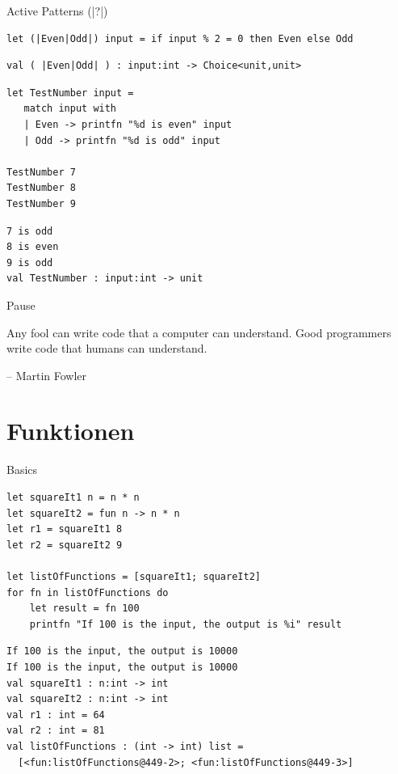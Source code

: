 \documentclass[t]{beamer}
\begin{document}
\begin{frame}[label={sec:org6b47015},fragile]{Active Patterns (|?|)}
 \scriptsize
\begin{verbatim}
let (|Even|Odd|) input = if input % 2 = 0 then Even else Odd
\end{verbatim}

\begin{verbatim}
val ( |Even|Odd| ) : input:int -> Choice<unit,unit>
\end{verbatim}


\begin{verbatim}
let TestNumber input =
   match input with
   | Even -> printfn "%d is even" input
   | Odd -> printfn "%d is odd" input

TestNumber 7
TestNumber 8
TestNumber 9
\end{verbatim}

\begin{verbatim}
7 is odd
8 is even
9 is odd
val TestNumber : input:int -> unit
\end{verbatim}
\end{frame}

\begin{frame}[label={sec:org540c804}]{Pause}
\begin{block}{}
Any fool can write code that a computer can understand. 
Good programmers write code that humans can understand.

\null\hfill-- Martin Fowler
\end{block}
\end{frame}


\section{Funktionen }
\label{sec:orgabb75bf}

\begin{frame}[label={sec:org9b651db},fragile]{Basics}
 \begin{verbatim}
let squareIt1 n = n * n
let squareIt2 = fun n -> n * n
let r1 = squareIt1 8
let r2 = squareIt2 9

let listOfFunctions = [squareIt1; squareIt2]
for fn in listOfFunctions do
    let result = fn 100
    printfn "If 100 is the input, the output is %i" result
\end{verbatim}

\begin{verbatim}
If 100 is the input, the output is 10000
If 100 is the input, the output is 10000
val squareIt1 : n:int -> int
val squareIt2 : n:int -> int
val r1 : int = 64
val r2 : int = 81
val listOfFunctions : (int -> int) list =
  [<fun:listOfFunctions@449-2>; <fun:listOfFunctions@449-3>]
\end{verbatim}
\end{frame}
\end{document}
